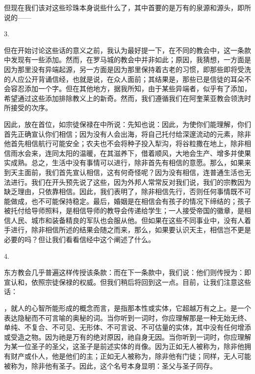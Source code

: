 但现在我们该对这些珍珠本身说些什么了，其中首要的是万有的泉源和源头，即所说的——\par

3. \par

但在开始讨论这些话的意义之前，我认为最好提一下，在不同的教会中，这一条款中发现有一些添加。然而，在罗马城的教会中并非如此；原因，我猜想，一方面是因为那里没有异端起源，另一方面是因为那里保持着古老的习惯，即那些即将受洗的人应公开背诵信经，也就是说，在众人面前；其结果是，那些已是信徒的耳朵不会容忍添加一个字。但在其他地方，据我所知，由于某些异端者，似乎有了添加，希望通过这些添加排除教义上的新奇。然而，我们遵循我们在阿奎莱亚教会领洗时所接受的次序。\par

因此，放在首位，如宗徒保禄在中所说：先知也说：因此，为使你们能理解，你们首先正确宣认你们相信；因为没有人会出海，将自己托付给深邃流动的元素，除非他首先相信航行可能安全；农夫也不会将种子投入犁沟，将谷粒撒在地上，除非相信雨水会来，连同太阳的温暖，在其滋养下，借着顺风，大地会生产、增多并使果实成熟。总之，生活中没有事情可以进行，除非首先有相信的意愿。那么，如果来到天主面前，我们首先宣认相信，这有何奇怪呢？因为没有相信，连普通生活也无法进行。我们在开头预先说了这些，因为外邦人常常反对我们说，我们的宗教因为缺乏理由，只依靠相信。因此，我们表明了，除非相信先行，否则任何事情既不可能做成，也不可能保持稳定。最后，婚姻是在相信会有孩子的情况下缔结的；孩子被托付给导师照料，是相信导师的教导会传递给学生；一人接受帝国的徽章，是相信人民、城市和装备精良的军队也会服从他。但如果在这些不同事业中，没有人着手进行，除非相信所述的结果会随之而来，那么，如果要认识天主，相信岂不更是必要的吗？但让我们看看信经中这个阐述了什么。\par

4. \par

东方教会几乎普遍这样传授该条款：而在下一条款中，我们说：他们则传授为：即宣认和，依照宗徒保禄的权威。但我们稍后将回到这一点。目前，让我们注意这些话：\par

，就人的心智所能形成的概念而言，是指那本性或实体，它超越万有之上。是一个表达隐秘而不可言喻的奥秘的词。当你听到一词时，你应理解那是一种无始无终、单纯、不复合、不可见、无形体、不可言说、不可估量的实体，其中没有任何增添或受造之物。因为祂是万有的绝对原因，祂自身无因。当你听到一词时，你应理解为某一位圣子的圣父，这圣子是前述实体的肖像。因为正如无人被称为，除非他拥有财产或仆人，他是他们的主；正如无人被称为，除非他有门徒；同样，无人可能被称为，除非他有圣子。因此，这个名号本身显明：圣父与圣子同存。\par

